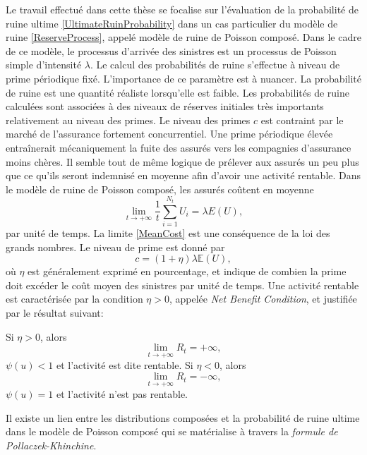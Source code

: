 Le travail effectué dans cette thèse se focalise sur l'évaluation de la probabilité de ruine ultime \eqref{UltimateRuinProbability} dans un cas particulier du modèle de ruine \ref{ReserveProcess}, appelé modèle de ruine de Poisson composé. Dans le cadre de ce modèle, le processus d'arrivée des sinistres est un processus de Poisson simple d'intensité $\lambda$. Le calcul des probabilités de ruine s'effectue à niveau de prime périodique fixé. L'importance de ce paramètre est à nuancer. La probabilité de ruine est une quantité réaliste lorsqu'elle est faible. Les probabilités de ruine calculées sont associées à des niveaux de réserves initiales très importants relativement au niveau des primes. Le niveau des primes $c$ est contraint par le marché de l'assurance fortement concurrentiel. Une prime périodique élevée entraînerait mécaniquement la fuite des assurés vers les compagnies d'assurance moins chères. Il semble tout de même logique de prélever aux assurés un peu plus que ce qu'ils seront indemnisé en moyenne afin d'avoir une activité rentable. Dans le modèle de ruine de Poisson composé, les assurés coûtent en moyenne
\begin{equation}\label{MeanCost}
\underset{t\rightarrow+\infty}{\lim}\frac{1}{t}\sum_{i=1}^{N_{t}}U_{i}=\lambda E(U),
\end{equation}
par unité de temps. La limite \eqref{MeanCost} est une conséquence de la loi des grands nombres. Le niveau de prime est donné par 
\begin{equation}\label{PremiumLevel}
c=(1+\eta)\lambda\mathbb{E}(U),
\end{equation}   
où $\eta$ est généralement exprimé en pourcentage, et indique de combien la prime doit excéder le coût moyen des sinistres par unité de temps. Une activité rentable est caractérisée par la condition $\eta>0$, appelée \textit{Net Benefit Condition}, et justifiée par le résultat suivant: 
\begin{Prop}\label{PropNetBenefitCondition}
Si $\eta>0$, alors 
\begin{equation}
\underset{t\rightarrow+\infty}{\lim}R_{t}=+\infty,
\end{equation}
$\psi(u)<1$ et l'activité est dite rentable. Si $\eta<0$, alors 
\begin{equation}
\underset{t\rightarrow+\infty}{\lim}R_{t}=-\infty,
\end{equation}
$\psi(u)=1$ et l'activité n'est pas rentable.
\end{Prop}
Il existe un lien entre les distributions composées et la probabilité de ruine ultime dans le modèle de Poisson composé qui se matérialise à travers la \textit{formule de Pollaczek-Khinchine}.
